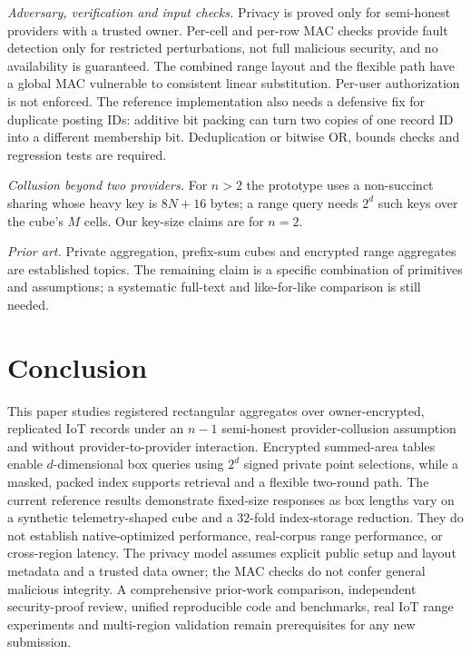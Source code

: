 \documentclass[a4paper,fleqn]{cas-sc}
\newif\ifanonymous
\begin{document}
\emph{Adversary, verification and input checks.} Privacy is proved only
for semi-honest providers with a trusted owner. Per-cell and per-row
MAC checks provide fault detection only for restricted perturbations,
not full malicious security, and no availability is guaranteed.
The combined range layout and the flexible path have a global MAC
vulnerable to consistent linear substitution. Per-user authorization is
not enforced. The reference implementation also needs a defensive
fix for duplicate posting IDs: additive bit packing can turn
two copies of one record ID into a different membership bit.
Deduplication or bitwise OR, bounds checks and regression tests are required.

\emph{Collusion beyond two providers.} For $n>2$ the prototype uses a
non-succinct sharing whose heavy key is $8N+16$ bytes; a range query needs
$2^d$ such keys over the cube's $M$ cells. Our key-size claims are for $n=2$.

\emph{Prior art.} Private aggregation, prefix-sum cubes and
encrypted range aggregates are established topics. The remaining
claim is a specific combination of primitives and assumptions;
a systematic full-text and like-for-like comparison is still needed.

\section{Conclusion}
\label{sec:conclusion}

This paper studies registered rectangular aggregates over owner-encrypted,
replicated IoT records under an $n-1$ semi-honest provider-collusion
assumption and without provider-to-provider interaction. Encrypted
summed-area tables enable $d$-dimensional box queries using $2^d$
signed private point selections, while a masked, packed index
supports retrieval and a flexible two-round path. The current
reference results demonstrate fixed-size responses as box lengths
vary on a synthetic telemetry-shaped cube and a $32$-fold
index-storage reduction. They do not establish native-optimized
performance, real-corpus range performance, or cross-region latency.
The privacy model assumes explicit public setup and layout metadata
and a trusted data owner; the MAC checks do not confer general
malicious integrity. A comprehensive prior-work comparison,
independent security-proof review, unified reproducible code and
benchmarks, real IoT range experiments and multi-region validation
remain prerequisites for any new submission.

\ifanonymous\else\printcredits\fi
\end{document}
